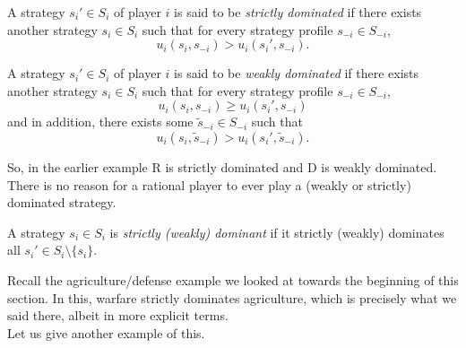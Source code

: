 	\begin{fdef}
		A strategy $s_i' \in S_i$ of player $i$ is said to be \emph{strictly dominated} if there exists another strategy $s_i \in S_i$ such that for every strategy profile $s_{-i} \in S_{-i}$,
		\[ u_i(s_i,s_{-i}) > u_i(s_i',s_{-i}). \]

		A strategy $s_i' \in S_i$ of player $i$ is said to be \emph{weakly dominated} if there exists another strategy $s_i \in S_i$ such that for every strategy profile $s_{-i} \in S_{-i}$,
		\[ u_i(s_i,s_{-i}) \ge u_i(s_i',s_{-i}) \]
		and in addition, there exists some $\tilde{s}_{-i} \in S_{-i}$ such that
		\[ u_i(s_i,\tilde{s}_{-i}) > u_i(s_i',\tilde{s}_{-i}). \]
	\end{fdef}
	So, in the earlier example \textsf{R} is strictly dominated and \textsf{D} is weakly dominated.\\
	There is no reason for a rational player to ever play a (weakly or strictly) dominated strategy.

	\begin{fdef}
		A strategy $s_i \in S_i$ is \emph{strictly (weakly) dominant} if it strictly (weakly) dominates all $s_i' \in S_i \setminus \{s_i\}$.
	\end{fdef}

	Recall the agriculture/defense example we looked at towards the beginning of this section. In this, warfare strictly dominates agriculture, which is precisely what we said there, albeit in more explicit terms.\\

	Let us give another example of this.

